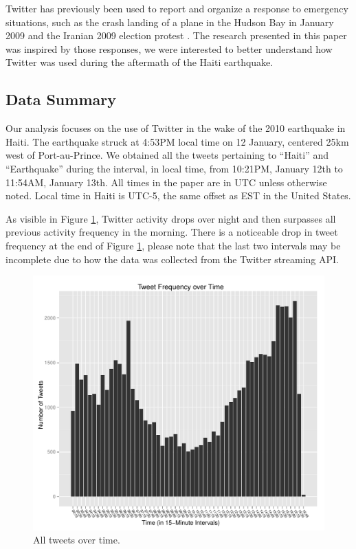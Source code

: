 \documentclass[a4paper, 11pt, titlepage]{article}
\begin{document}
Twitter has previously been used to report and organize a response to emergency situations, such as the crash landing of a plane in the Hudson Bay in January 2009 \cite{Deards2009} and the Iranian 2009 election protest \cite{Grossman2009}.  The research presented in this paper was inspired by those responses, we were interested to better understand how Twitter was used during the aftermath of the Haiti earthquake.

\subsection{Data Summary}
Our analysis focuses on the use of Twitter in the wake of the 2010 earthquake in Haiti. The earthquake struck at 4:53PM local time on 12 January, centered 25km west of Port-au-Prince. We obtained all the tweets pertaining to ``Haiti'' and ``Earthquake'' during the interval, in local time, from 10:21PM, January 12th to 11:54AM, January 13th.  All times in the paper are in UTC unless otherwise noted.  Local time in Haiti is UTC-5, the same offset as EST in the United States.  

As visible in Figure \ref{fig:all_tweets_over_time}, Twitter activity drops over night and then surpasses all previous activity frequency in the morning.  There is a noticeable drop in tweet frequency at the end of Figure \ref{fig:all_tweets_over_time}, please note that the last two intervals may be incomplete due to how the data was collected from the Twitter streaming API.

\begin{figure}[h]
\centering
\includegraphics[width=120mm]{../figures/all_tweets_over_time}
\caption{All tweets over time.}
\label{fig:all_tweets_over_time}
\end{figure}
\end{document}
